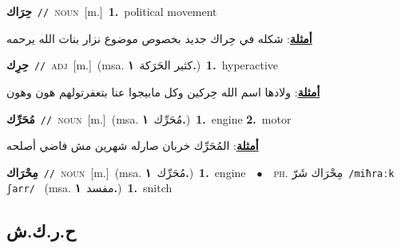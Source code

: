 \documentclass[10pt,a4paper,twoside]{article} %
\begin{document}
\begin{multicols}{2}
{\setlength\topsep{0pt}\textbf{\foreignlanguage{arabic}{حِرَاك}}\ {\color{gray}\texttt{//}\color{black}}\ \textsc{noun}\ [m.]\ \textbf{1.}~political movement\  \begin{flushright}\color{gray}\foreignlanguage{arabic}{\textbf{\underline{\foreignlanguage{arabic}{أمثلة}}}: شكله في حِراك جديد بخصوص موضوع نزار بنات الله يرحمه}\end{flushright}\color{black}} \vspace{2mm}

{\setlength\topsep{0pt}\textbf{\foreignlanguage{arabic}{حِرِك}}\ {\color{gray}\texttt{//}\color{black}}\ \textsc{adj}\ [m.]\ \color{gray}(msa. \foreignlanguage{arabic}{كثير الحَرَكة}~\foreignlanguage{arabic}{\textbf{١.}})\color{black}\ \textbf{1.}~hyperactive\  \begin{flushright}\color{gray}\foreignlanguage{arabic}{\textbf{\underline{\foreignlanguage{arabic}{أمثلة}}}: ولادها اسم الله حِركين وكل مابيجوا عنا بتعفرتولهم هون وهون}\end{flushright}\color{black}} \vspace{2mm}

{\setlength\topsep{0pt}\textbf{\foreignlanguage{arabic}{مُحَرِّك}}\ {\color{gray}\texttt{//}\color{black}}\ \textsc{noun}\ [m.]\ \color{gray}(msa. \foreignlanguage{arabic}{مُحَرِّك}~\foreignlanguage{arabic}{\textbf{١.}})\color{black}\ \textbf{1.}~engine  \textbf{2.}~motor\  \begin{flushright}\color{gray}\foreignlanguage{arabic}{\textbf{\underline{\foreignlanguage{arabic}{أمثلة}}}: المُحَرِّك خربان صارله شهرين مش فاضي أصلحه}\end{flushright}\color{black}} \vspace{2mm}

{\setlength\topsep{0pt}\textbf{\foreignlanguage{arabic}{مِحْرَاك}}\ {\color{gray}\texttt{//}\color{black}}\ \textsc{noun}\ [m.]\ \color{gray}(msa. \foreignlanguage{arabic}{مُحَرِّك}~\foreignlanguage{arabic}{\textbf{١.}})\color{black}\ \textbf{1.}~engine\ \ $\bullet$\ \ \textsc{ph.} \color{gray} \foreignlanguage{arabic}{مِحْرَاك شَرّ}\color{black}\ {\color{gray}\texttt{/{\sffamily miħraːk ʃarr}/}\color{black}}\ \color{gray} (msa. \foreignlanguage{arabic}{مفسد}~\foreignlanguage{arabic}{\textbf{١.}})\color{black}\ \textbf{1.}~snitch\ } \vspace{2mm}

\vspace{-3mm}
\subsection*{\color{blue}\foreignlanguage{arabic}{ح.ر.ك.ش}\color{blue}{}} 


\end{multicols}
\end{document}

